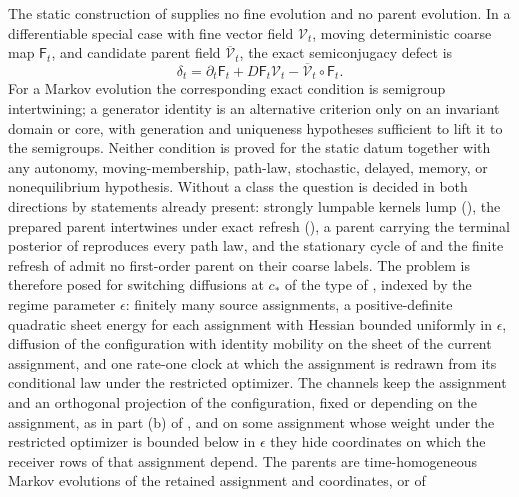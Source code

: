 The static construction of  supplies no fine
evolution and no parent evolution. In a differentiable special case with fine vector
field $\mathscr V_t$, moving deterministic coarse map $\mathsf F_t$, and candidate
parent field $\overline{\mathscr V}_t$, the exact semiconjugacy defect is
\begin{equation}
\delta_t=\partial_t\mathsf F_t+D\mathsf F_t\mathscr V_t-\overline{\mathscr V}_t\circ\mathsf F_t .
\label{eq:rg-pointwise-parent-semiconjugacy-defect}
\end{equation}
For a Markov evolution the corresponding exact condition is semigroup intertwining; a
generator identity is an alternative criterion only on an invariant domain or core,
with generation and uniqueness hypotheses sufficient to lift it to the semigroups.
Neither condition is proved for the static datum together with any autonomy,
moving-membership, path-law, stochastic, delayed, memory, or nonequilibrium
hypothesis. Without a class the question is decided in both directions by
statements already present: strongly lumpable kernels lump
(), the prepared parent intertwines under exact
refresh (), a parent carrying the terminal
posterior of  reproduces every path law, and the
stationary cycle of  and the finite refresh of
 admit no first-order parent on their coarse
labels. The problem is therefore posed for switching diffusions at $c_*$ of the
type of , indexed by the regime parameter
$\epsilon$: finitely many source assignments, a positive-definite quadratic sheet
energy for each assignment with Hessian bounded uniformly in $\epsilon$, diffusion
of the configuration with identity mobility on the sheet of the current assignment,
and one rate-one clock at which the assignment is redrawn from its conditional law
under the restricted optimizer. The channels keep the assignment and an orthogonal
projection of the configuration, fixed or depending on the assignment, as in part
(b) of , and on some assignment whose
weight under the restricted optimizer is bounded below in $\epsilon$ they hide
coordinates on which the receiver rows of that assignment depend. The parents are
time-homogeneous Markov evolutions of the retained assignment and coordinates, or of
